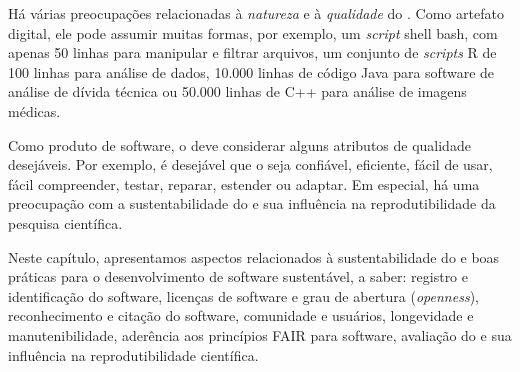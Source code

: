 Há várias preocupações relacionadas à \textit{natureza} e à \textit{qualidade} do \RS. 
%
Como artefato digital, ele pode assumir muitas formas, por exemplo, um \textit{script} shell bash, com apenas 50 linhas para manipular e filtrar arquivos, um conjunto de \textit{scripts} R de 100 linhas para análise de dados, 10.000 linhas de código Java para software de análise de dívida técnica ou 50.000 linhas de C++ para análise de imagens médicas. 
%

%
Como produto de software, o \RSw deve considerar alguns atributos de qualidade desejáveis.
Por exemplo, é desejável que o \RSw seja confiável, eficiente, fácil de usar, fácil compreender, testar, reparar, estender ou adaptar.
% 
Em especial, há uma preocupação com a sustentabilidade do \RSw e sua influência na reprodutibilidade da pesquisa científica.

Neste capítulo, apresentamos aspectos relacionados à  sustentabilidade do \RSw e boas práticas para o desenvolvimento de software sustentável, a saber: 
registro e identificação do software, licenças de software e grau de abertura (\textit{openness}), reconhecimento e citação do software, comunidade e usuários, longevidade e manutenibilidade, aderência aos princípios FAIR para software, avaliação do \RS e sua influência na reprodutibilidade científica.


